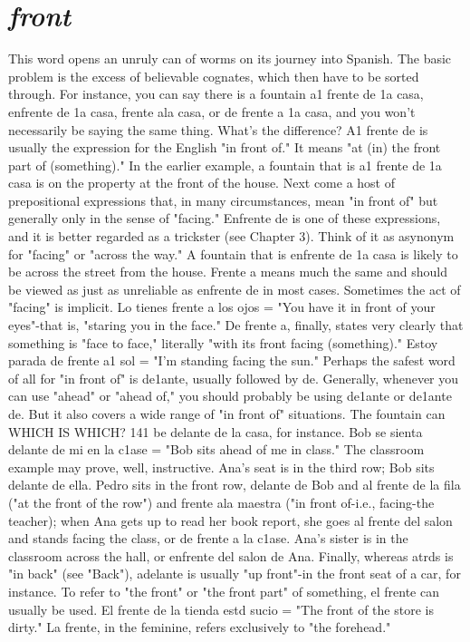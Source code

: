 \documentclass[14pt,a4paper,oneside]{memoir}
\begin{document}
\section{\emph{front}}

This word opens an unruly can of worms on its journey into
Spanish. The basic problem is the excess of believable cognates, which
then have to be sorted through. For instance, you can say there is a
fountain a1 frente de 1a casa, enfrente de 1a casa, frente ala casa, or
de frente a 1a casa, and you won't necessarily be saying the same
thing. What's the difference?
A1 frente de is usually the expression for the English "in front
of." It means "at (in) the front part of (something)." In the earlier example, a fountain that is a1 frente de 1a casa is on the property at the
front of the house. Next come a host of prepositional expressions that,
in many circumstances, mean "in front of" but generally only in the
sense of "facing." Enfrente de is one of these expressions, and it is better regarded as a trickster (see Chapter 3). Think of it as asynonym for
"facing" or "across the way." A fountain that is enfrente de 1a casa is
likely to be across the street from the house. Frente a means much the
same and should be viewed as just as unreliable as enfrente de in most
cases. Sometimes the act of "facing" is implicit. Lo tienes frente a los
ojos = "You have it in front of your eyes"-that is, "staring you in the
face." De frente a, finally, states very clearly that something is "face
to face," literally "with its front facing (something)." Estoy parada de
frente a1 sol = "I'm standing facing the sun."
Perhaps the safest word of all for "in front of" is de1ante, usually followed by de. Generally, whenever you can use "ahead" or
"ahead of," you should probably be using de1ante or de1ante de. But it
also covers a wide range of "in front of" situations. The fountain can
WHICH IS WHICH? 141
be delante de la casa, for instance. Bob se sienta delante de mi en la
c1ase = "Bob sits ahead of me in class."
The classroom example may prove, well, instructive. Ana's
seat is in the third row; Bob sits delante de ella. Pedro sits in the front
row, delante de Bob and al frente de la fila ("at the front of the row")
and frente ala maestra ("in front of-i.e., facing-the teacher); when
Ana gets up to read her book report, she goes al frente del salon and
stands facing the class, or de frente a la c1ase. Ana's sister is in the
classroom across the hall, or enfrente del salon de Ana.
Finally, whereas atrds is "in back" (see "Back"), adelante is
usually "up front"-in the front seat of a car, for instance. To refer to
"the front" or "the front part" of something, el frente can usually be
used. El frente de la tienda estd sucio = "The front of the store is
dirty." La frente, in the feminine, refers exclusively to "the forehead."
\end{document}
